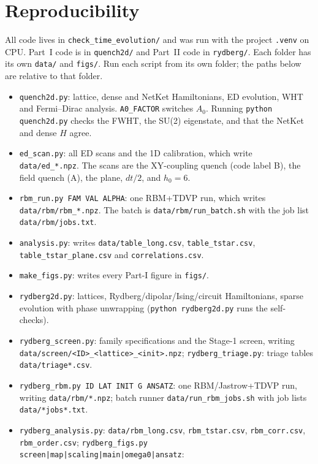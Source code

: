\documentclass[11pt,a4paper]{article}
\begin{document}
\section{Reproducibility}
\sloppy
All code lives in \texttt{check\_time\_evolution/} and was run with the project \texttt{.venv} on CPU. Part~I code is in \texttt{quench2d/} and Part~II code in \texttt{rydberg/}. Each folder has its own \texttt{data/} and \texttt{figs/}. Run each script from its own folder; the paths below are relative to that folder.
\begin{itemize}
  \item \texttt{quench2d.py}: lattice, dense and NetKet Hamiltonians, ED evolution, WHT and
    Fermi--Dirac analysis. \texttt{A0\_FACTOR} switches $A_0$. Running
    \texttt{python quench2d.py} checks the FWHT, the SU(2) eigenstate, and that the NetKet and dense
    $H$ agree.
  \item \texttt{ed\_scan.py}: all ED scans and the 1D calibration, which write
    \texttt{data/ed\_*.npz}. The scans are the XY-coupling quench (code label B), the field quench (A), the plane,
    $dt/2$, and $h_0=6$.
  \item \texttt{rbm\_run.py FAM VAL ALPHA}: one RBM+TDVP run, which writes
    \texttt{data/rbm/rbm\_*.npz}. The batch is \texttt{data/rbm/run\_batch.sh} with the job list
    \texttt{data/rbm/jobs.txt}.
  \item \texttt{analysis.py}: writes \texttt{data/table\_long.csv}, \texttt{table\_tstar.csv},
    \texttt{table\_tstar\_plane.csv} and \texttt{correlations.csv}.
  \item \texttt{make\_figs.py}: writes every Part-I figure in \texttt{figs/}.
  \item \texttt{rydberg2d.py}: lattices, Rydberg/dipolar/Ising/circuit Hamiltonians, sparse evolution with phase
    unwrapping (\texttt{python rydberg2d.py} runs the self-checks).
  \item \texttt{rydberg\_screen.py}: family specifications and the Stage-1 screen, writing
    \texttt{data/screen/<ID>\_<lattice>\_<init>.npz}; \texttt{rydberg\_triage.py}: triage tables
    \texttt{data/triage*.csv}.
  \item \texttt{rydberg\_rbm.py ID LAT INIT G ANSATZ}: one RBM/Jastrow+TDVP run, writing
    \texttt{data/rbm/*.npz}; batch runner \texttt{data/run\_rbm\_jobs.sh} with job lists
    \texttt{data/*jobs*.txt}.
  \item \texttt{rydberg\_analysis.py}: \texttt{data/rbm\_long.csv}, \texttt{rbm\_tstar.csv},
    \texttt{rbm\_corr.csv}, \texttt{rbm\_order.csv}; \texttt{rydberg\_figs.py screen|map|scaling|main|omega0|ansatz}:

\end{itemize}
\end{document}
